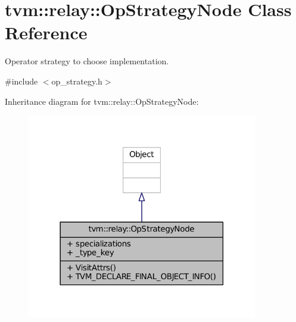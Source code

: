 \hypertarget{classtvm_1_1relay_1_1OpStrategyNode}{}\section{tvm\+:\+:relay\+:\+:Op\+Strategy\+Node Class Reference}
\label{classtvm_1_1relay_1_1OpStrategyNode}


Operator strategy to choose implementation.  




{\ttfamily \#include $<$op\+\_\+strategy.\+h$>$}



Inheritance diagram for tvm\+:\+:relay\+:\+:Op\+Strategy\+Node\+:
\nopagebreak
\begin{figure}[H]
\begin{center}
\leavevmode
\includegraphics[width=285pt]{classtvm_1_1relay_1_1OpStrategyNode__inherit__graph}
\end{center}
\end{figure}


